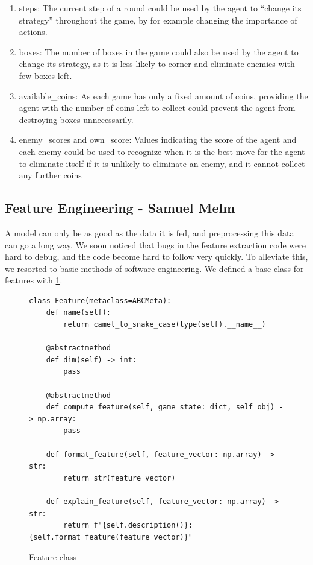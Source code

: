 \documentclass{article}
\begin{document}
\begin{enumerate}
    \item steps: The current step of a round could be used by the agent to “change its strategy” throughout the game, by for example changing the importance of actions.
    \item boxes: The number of boxes in the game could also be used by the agent to change its strategy, as it is less likely to corner and eliminate enemies with few boxes left.
    \item available\_coins: As each game has only a fixed amount of coins, providing the agent with the number of coins left to collect could prevent the agent from destroying boxes unnecessarily.
    \item enemy\_scores and own\_score: Values indicating the score of the agent and each enemy could be used to recognize when it is the best move for the agent to eliminate itself if it is unlikely to eliminate an enemy, and it cannot collect any further coins
\end{enumerate}

\subsection[Feature Engineering]{Feature Engineering {\small - Samuel Melm}}

A model can only be as good as the data it is fed, and preprocessing this data can go a long way. We soon noticed that bugs in the feature extraction code were hard to debug, and the code become hard to follow very quickly. To alleviate this, we resorted to basic methods of software engineering. We defined a base class for features with \ref{code:feature_class}.

\begin{figure}
\centering
\begin{verbatim}
class Feature(metaclass=ABCMeta):
    def name(self):
        return camel_to_snake_case(type(self).__name__)

    @abstractmethod
    def dim(self) -> int:
        pass

    @abstractmethod
    def compute_feature(self, game_state: dict, self_obj) -> np.array:
        pass

    def format_feature(self, feature_vector: np.array) -> str:
        return str(feature_vector)

    def explain_feature(self, feature_vector: np.array) -> str:
        return f"{self.description()}: {self.format_feature(feature_vector)}"
\end{verbatim}
\caption{Feature class}
\label{code:feature_class}
\end{figure}
\end{document}
